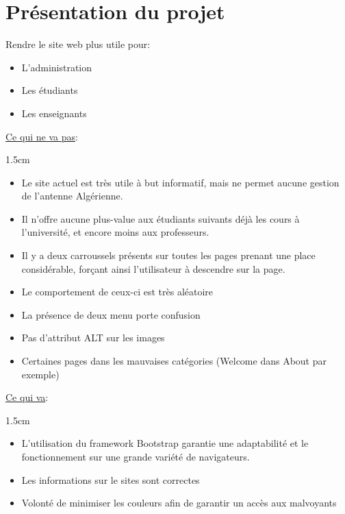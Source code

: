 \documentclass[oneside]{report}
\newcommand{\indentunder}{1.5cm}
\begin{document}
	\chapter{Présentation du projet}
	{
		\par Rendre le site web plus utile pour:
		\begin{itemize}
			\item{L'administration}
			\item{Les étudiants}
			\item{Les enseignants}
		\end{itemize}
		\vspace{1cm}
		\par\underline{Ce qui ne va pas}:
		\vspace{.5cm}
		\begin{adjustwidth}{\indentunder}{}
		\begin{itemize}
			\item Le site actuel est très utile à but informatif, mais ne permet aucune gestion de l'antenne Algérienne.
			\item Il n'offre aucune plus-value aux étudiants suivants déjà les cours à l'université, et encore moins aux professeurs.
			\item Il y a deux carroussels présents sur toutes les pages prenant une place considérable, forçant ainsi l'utilisateur à descendre sur la page.
			\item Le comportement de ceux-ci est très aléatoire
			\item La présence de deux menu porte confusion
			\item Pas d'attribut ALT sur les images
			\item Certaines pages dans les mauvaises catégories (Welcome dans About par exemple)
		\end{itemize}
		\end{adjustwidth}
	\vspace{1cm}
	\par\underline{Ce qui va}:
		\vspace{.5cm}
		\begin{adjustwidth}{\indentunder}{}
		\begin{itemize}
			\item L'utilisation du framework Bootstrap garantie une adaptabilité et le fonctionnement sur une grande variété de navigateurs.
			\item Les informations sur le sites sont correctes
			\item Volonté de minimiser les couleurs afin de garantir un accès aux malvoyants
		\end{itemize}
		\end{adjustwidth}
	
}
\end{document}
